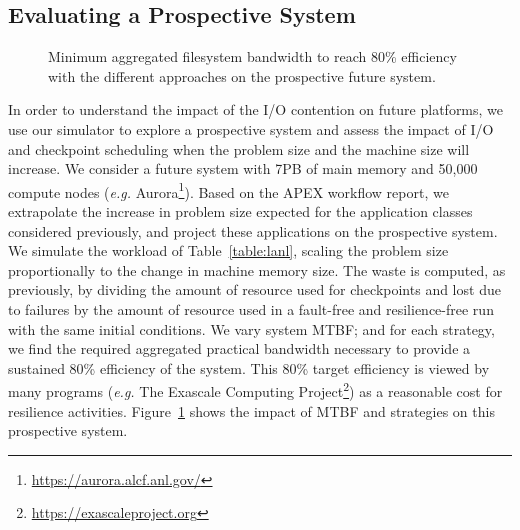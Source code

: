 \documentclass[conference,nofonttune]{IEEEtran}
\newcommand{\eg}[0]{\emph{e.g.}\xspace}
\newcommand{\fifononblock}{\emph{Ordered-NB}\xspace}
\def\fifofixed{\fifononblock-Fixed\xspace}
\begin{document}

\subsection{Evaluating a Prospective System}

\begin{figure}
  \begin{center}
    \resizebox{1.05\linewidth}{!}{}
  \end{center}
  \caption{Minimum aggregated filesystem bandwidth to reach 80\%
    efficiency with the different approaches on the prospective
    future system.\label{fig:prosp}}
\end{figure}

In order to understand the impact of the I/O contention on future platforms, we
use our simulator to explore a prospective system and assess the impact of I/O
and checkpoint scheduling when the problem size and the machine size will
increase. We consider a future system with 7PB of main memory and 50,000
compute nodes (\eg Aurora\footnote{\url{https://aurora.alcf.anl.gov/}}). Based
on the APEX workflow report, we extrapolate the increase in problem size
expected for the application classes considered previously, and project these
applications on the prospective system.  We simulate the workload of
Table~\ref{table:lanl}, scaling the problem size proportionally to the change
in machine memory size. The waste is computed, as previously, by dividing the
amount of resource used for checkpoints and lost due to failures by the amount
of resource used in a fault-free and resilience-free run with the same initial
conditions.
%
We vary system MTBF; and for each strategy, we find the required aggregated
practical bandwidth necessary to provide a sustained 80\% efficiency of the
system.  This 80\% target efficiency is viewed by many programs (\eg 
The Exascale Computing Project\footnote{\url{https://exascaleproject.org}}) as a
reasonable cost for resilience activities.
%
Figure~\ref{fig:prosp} shows the impact of MTBF and strategies on this
prospective system.
\end{document}
